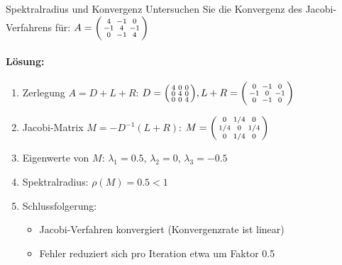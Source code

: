 \begin{example2}{Spektralradius und Konvergenz}
Untersuchen Sie die Konvergenz des Jacobi-Verfahrens für:
$A = \begin{psmallmatrix}
4 & -1 & 0 \\
-1 & 4 & -1 \\
0 & -1 & 4
\end{psmallmatrix}$

\paragraph{Lösung:}
\begin{enumerate}
    \item Zerlegung $A = D + L + R$:
    $D = \begin{psmallmatrix}
    4 & 0 & 0 \\
    0 & 4 & 0 \\
    0 & 0 & 4
    \end{psmallmatrix}, L+R = \begin{psmallmatrix}
    0 & -1 & 0 \\
    -1 & 0 & -1 \\
    0 & -1 & 0
    \end{psmallmatrix}$
    
    \item Jacobi-Matrix $M = -D^{-1}(L+R)$:
    $M = \begin{psmallmatrix}
    0 & 1/4 & 0 \\
    1/4 & 0 & 1/4 \\
    0 & 1/4 & 0
    \end{psmallmatrix}$
    
    \item Eigenwerte von $M$: $\lambda_1 = 0.5$, $\lambda_2 = 0$, $\lambda_3 = -0.5$
    
    \item Spektralradius: $\rho(M) = 0.5 < 1$
    
    \item Schlussfolgerung:
    \begin{itemize}
        \item Jacobi-Verfahren konvergiert (Konvergenzrate ist linear)
        \item Fehler reduziert sich pro Iteration etwa um Faktor 0.5
    \end{itemize}
\end{enumerate}
\end{example2}



